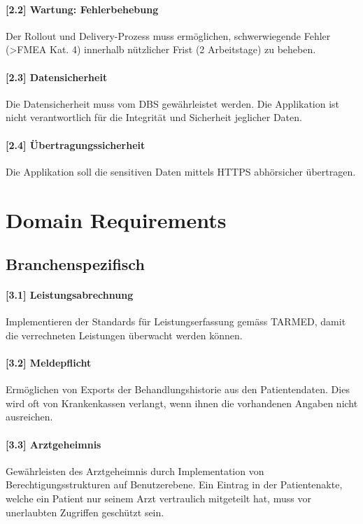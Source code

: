 \documentclass[a4paper]{scrreprt}
\begin{document}
\paragraph{[2.2] Wartung: Fehlerbehebung}
Der Rollout und Delivery-Prozess muss ermöglichen, schwerwiegende Fehler (\textgreater FMEA Kat. 4) innerhalb nützlicher Frist (2 Arbeitstage) zu beheben.

\paragraph{[2.3] Datensicherheit}
Die Datensicherheit muss vom DBS gewährleistet werden. Die Applikation ist nicht verantwortlich für die Integrität und Sicherheit jeglicher Daten.
 
\paragraph{[2.4] Übertragungssicherheit}
Die Applikation soll die sensitiven Daten mittels HTTPS abhörsicher übertragen. 

\section{Domain Requirements}
\subsection{Branchenspezifisch}
\paragraph{[3.1] Leistungsabrechnung} Implementieren der Standards für Leistungserfassung gemäss TARMED, damit die verrechneten Leistungen überwacht werden können.

\paragraph{[3.2] Meldepflicht} Ermöglichen von Exports der Behandlungshistorie aus den Patientendaten. Dies wird oft von Krankenkassen verlangt, wenn ihnen die vorhandenen Angaben nicht ausreichen.

\paragraph{[3.3] Arztgeheimnis} Gewährleisten des Arztgeheimnis durch Implementation von Berechtigungsstrukturen auf Benutzerebene. Ein Eintrag in der Patientenakte, welche ein Patient nur seinem Arzt vertraulich mitgeteilt hat, muss vor unerlaubten Zugriffen geschützt sein.
\end{document}
